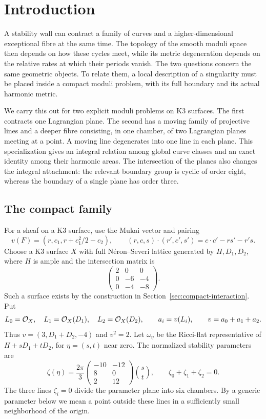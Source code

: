 \section{Introduction}\label{sec:introduction}

A stability wall can contract a family of curves and a higher-dimensional
exceptional fibre at the same time. The topology of the smooth moduli
space then depends on how these cycles meet, while its metric degeneration
depends on the relative rates at which their periods vanish. The two
questions concern the same geometric objects. To relate them, a local
description of a singularity must be placed inside a compact moduli
problem, with its full boundary and its actual harmonic metric.

We carry this out for two explicit moduli problems on K3 surfaces. The
first contracts one Lagrangian plane. The second has a moving family of
projective lines and a deeper fibre consisting, in one chamber, of two
Lagrangian planes meeting at a point. A moving line degenerates into one
line in each plane. This specialization gives an integral relation among
global curve classes and an exact identity among their harmonic areas.
The intersection of the planes also changes the integral attachment:
the relevant boundary group is cyclic of order eight, whereas the
boundary of a single plane has order three.

\subsection{The compact family}
For a sheaf on a K3 surface, use the Mukai vector and pairing
\[
 v(F)=(r,c_1,r+c_1^2/2-c_2),\qquad
 (r,c,s)\cdot(r',c',s')=c\cdot c'-rs'-r's.
\]
Choose a K3 surface $X$ with full N\'eron--Severi lattice generated by
$H,D_1,D_2$, where $H$ is ample and the intersection matrix is
\begin{equation}\label{eq:intro-lattice}
 \begin{pmatrix}2&0&0\\0&-6&-4\\0&-4&-8\end{pmatrix}.
\end{equation}
Such a surface exists by the construction in
Section~\ref{sec:compact-interaction}. Put
\[
 L_0=\mathcal O_X,\quad L_1=\mathcal O_X(D_1),\quad L_2=\mathcal O_X(D_2),
 \qquad a_i=v(L_i),\qquad v=a_0+a_1+a_2.
\]
Thus $v=(3,D_1+D_2,-4)$ and $v^2=2$. Let $\omega_\eta$ be the
Ricci-flat representative of $H+sD_1+tD_2$, for
$\eta=(s,t)$ near zero. The normalized stability parameters are
\begin{equation}\label{eq:intro-levels}
 \zeta(\eta)=\frac{2\pi}{3}
 \begin{pmatrix}-10&-12\\8&0\\2&12\end{pmatrix}
 \binom{s}{t},\qquad \zeta_0+\zeta_1+\zeta_2=0.
\end{equation}
The three lines $\zeta_i=0$ divide the parameter plane into six
chambers. By a generic parameter below we mean a point outside these
lines in a sufficiently small neighborhood of the origin.

